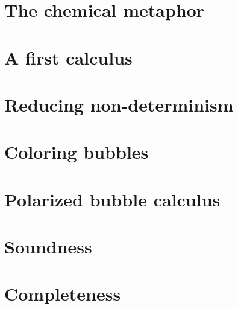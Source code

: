 \section{The chemical metaphor}

\section{A first calculus}

\section{Reducing non-determinism}

\section{Coloring bubbles}

\section{Polarized bubble calculus}

\section{Soundness}

\section{Completeness}